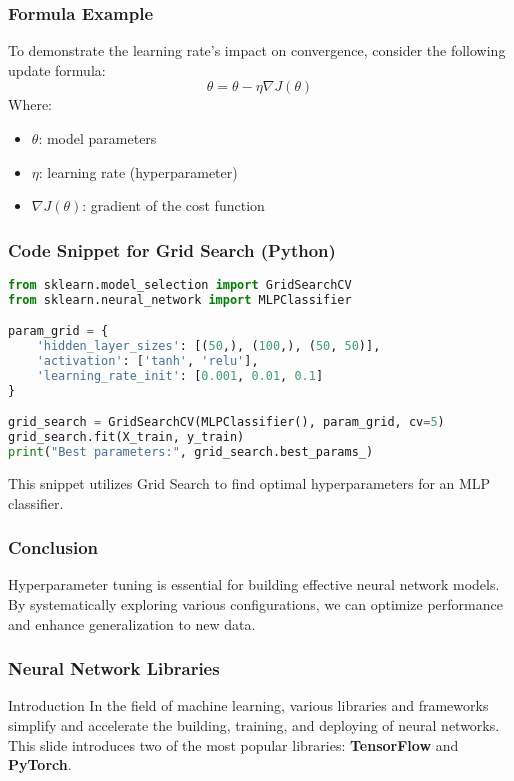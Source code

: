 \documentclass[aspectratio=169]{beamer}
\begin{document}
\begin{frame}
    \frametitle{Formula Example}
    To demonstrate the learning rate's impact on convergence, consider the following update formula:
    \begin{equation}
        \theta = \theta - \eta \nabla J(\theta)
    \end{equation}
    Where:
    \begin{itemize}
        \item $\theta$: model parameters
        \item $\eta$: learning rate (hyperparameter)
        \item $\nabla J(\theta)$: gradient of the cost function
    \end{itemize}
\end{frame}

\begin{frame}[fragile]
    \frametitle{Code Snippet for Grid Search (Python)}
    \begin{lstlisting}[language=Python]
from sklearn.model_selection import GridSearchCV
from sklearn.neural_network import MLPClassifier

param_grid = {
    'hidden_layer_sizes': [(50,), (100,), (50, 50)],
    'activation': ['tanh', 'relu'],
    'learning_rate_init': [0.001, 0.01, 0.1]
}

grid_search = GridSearchCV(MLPClassifier(), param_grid, cv=5)
grid_search.fit(X_train, y_train)
print("Best parameters:", grid_search.best_params_)
    \end{lstlisting}
    This snippet utilizes Grid Search to find optimal hyperparameters for an MLP classifier.
\end{frame}

\begin{frame}
    \frametitle{Conclusion}
    Hyperparameter tuning is essential for building effective neural network models. By systematically exploring various configurations, we can optimize performance and enhance generalization to new data.
\end{frame}

\begin{frame}
    \frametitle{Neural Network Libraries}
    \begin{block}{Introduction}
        In the field of machine learning, various libraries and frameworks simplify and accelerate the building, training, and deploying of neural networks. This slide introduces two of the most popular libraries: \textbf{TensorFlow} and \textbf{PyTorch}.
    \end{block}
\end{frame}
\end{document}
